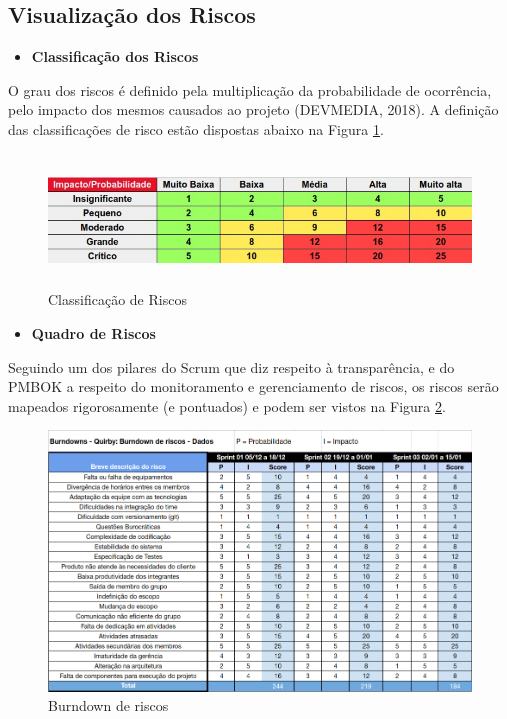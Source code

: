 \subsection{Visualização dos Riscos}
\begin{itemize}
    \item \textbf{Classificação dos Riscos}
\end{itemize}
O grau dos riscos é definido pela multiplicação da probabilidade de ocorrência, pelo impacto dos mesmos causados ao projeto (DEVMEDIA, 2018).
A definição das classificações de risco estão dispostas abaixo na Figura \ref{Tabela 12}.

\begin{figure}[H]
\begin{center}
\includegraphics[width= 16cm, height=3.5cm]{figuras/Classific_risco.jpg}
\caption{Classificação de Riscos}
\label{Tabela 12}
\end{center}
\end{figure}

\begin{itemize}
    \item \textbf{Quadro de Riscos}
\end{itemize}
Seguindo um dos pilares do Scrum que diz respeito à transparência, e do PMBOK a respeito do monitoramento e gerenciamento de riscos, os riscos serão mapeados rigorosamente (e pontuados) e podem ser vistos na Figura \ref{burndownRiscos}.

\begin{figure}[h!]
\centering
\includegraphics[width=\textwidth]{figuras/burndownRiscos.png}
\caption{Burndown de riscos}
\label{burndownRiscos}
\end{figure}

